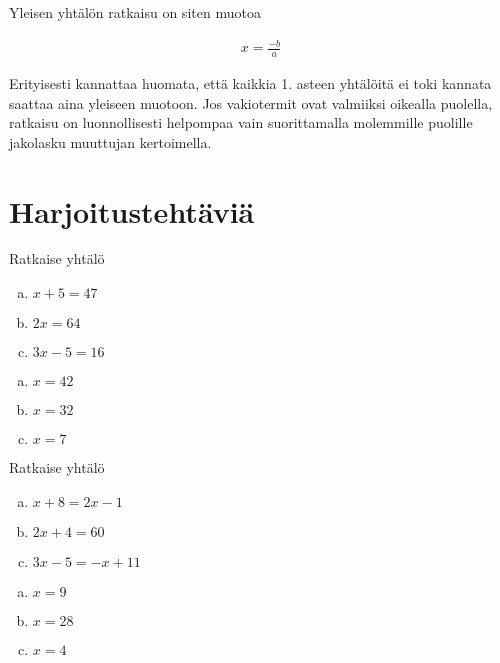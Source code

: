 Yleisen yhtälön ratkaisu on siten muotoa

\begin{align*}
  x = \frac{-b}{a}
\end{align*}

Erityisesti kannattaa huomata, että kaikkia 1. asteen yhtälöitä ei toki
kannata saattaa aina yleiseen muotoon. Jos vakiotermit ovat valmiiksi oikealla
puolella, ratkaisu on luonnollisesti helpompaa vain suorittamalla
molemmille puolille jakolasku muuttujan kertoimella.

\section{Harjoitustehtäviä}

\begin{tehtava}
    Ratkaise yhtälö
    \begin{enumerate}[(a)]
        \item $x + 5 = 47$
        \item $2x = 64$
        \item $3x - 5 = 16$
    \end{enumerate}
    \begin{vastaus}
        \begin{enumerate}[(a)]
            \item $x = 42$
            \item $x = 32$
            \item $x = 7$
        \end{enumerate}
    \end{vastaus}
\end{tehtava}

\begin{tehtava}
    Ratkaise yhtälö
    \begin{enumerate}[(a)]
        \item $x + 8 = 2x - 1$
        \item $2x + 4 = 60$
        \item $3x - 5 = -x + 11$
    \end{enumerate}
    \begin{vastaus}
        \begin{enumerate}[(a)]
            \item $x = 9$
            \item $x = 28$
            \item $x = 4$
        \end{enumerate}
    \end{vastaus}
\end{tehtava}

